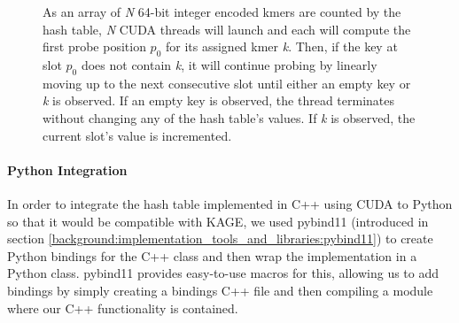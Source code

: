\begin{figure}[H]
\begin{center}
{
}
\caption{
  As an array of \textit{N} 64-bit integer encoded kmers are counted by the hash table, \textit{N} CUDA threads will launch and each will compute the first probe position $p_0$ for its assigned kmer \textit{k}. Then, if the key at slot $p_0$ does not contain \textit{k}, it will continue probing by linearly moving up to the next consecutive slot until either an empty key or \textit{k} is observed. If an empty key is observed, the thread terminates without changing any of the hash table's values. If \textit{k} is observed, the current slot's value is incremented.
}
\label{methods:gpu_accelerating_kmer_counting:figures:count_example}
\end{center}
\end{figure}

\paragraph{Python Integration}
In order to integrate the hash table implemented in C++ using CUDA to Python so that it would be compatible with KAGE, we used pybind11 (introduced in section \ref{background:implementation_tools_and_libraries:pybind11}) to create Python bindings for the C++ class and then wrap the implementation in a Python class.
pybind11 provides easy-to-use macros for this, allowing us to add bindings by simply creating a bindings C++ file and then compiling a module where our C++ functionality is contained.

